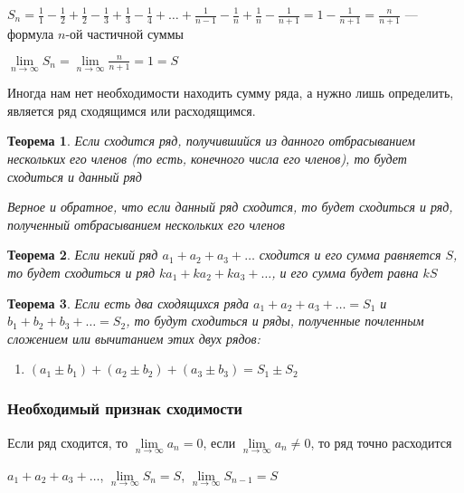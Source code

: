 \documentclass{article}
\newtheorem{theorem}{Теорема}
\begin{document}
$S_n = \frac{1}{1} - \frac{1}{2} + \frac{1}{2} - \frac{1}{3} + \frac{1}{3} - \frac{1}{4} + \dots + \frac{1}{n - 1} - \frac{1}{n} + \frac{1}{n} - \frac{1}{n + 1} = 1 - \frac{1}{n + 1} = \frac{n}{n + 1}$ — формула $n$-ой частичной суммы

$\lim\limits_{n \to \infty} S_{n} = \lim\limits_{n \to \infty} \frac{n}{n + 1} = 1 = S$


\hfill


Иногда нам нет необходимости находить сумму ряда, а нужно лишь определить, является ряд сходящимся или расходящимся.

\begin{theorem}
    Если сходится ряд, получившийся из данного отбрасыванием нескольких его членов (то есть, конечного числа его членов), то будет сходиться и данный ряд
    
    Верное и обратное, что если данный ряд сходится, то будет сходиться и ряд, полученный отбрасыванием нескольких его членов
\end{theorem}

\begin{theorem}
    Если некий ряд $a_1 + a_2 + a_3 + \dots$ сходится и его сумма равняется $S$, то будет сходиться и ряд $ka_1 + ka_2 + ka_3 + \dots$, и его сумма будет равна $k S$
\end{theorem}

\begin{theorem}
    Если есть два сходящихся ряда $a_1 + a_2 + a_3 + \dots = S_1$ и $b_1 + b_2 + b_3 + \dots = S_2$, то будут сходиться и ряды, полученные почленным сложением или вычитанием этих двух рядов:
    \begin{enumerate}
        \item $(a_1 \pm b_1) + (a_2 \pm b_2) + (a_3 \pm b_3) = S_1 \pm S_2$
    \end{enumerate}
\end{theorem}

\subsubsection{Необходимый признак сходимости}

Если ряд сходится, то $\lim\limits_{n \to \infty} a_{n} = 0$, если $\lim\limits_{n \to \infty} a_n \ne 0$, то ряд точно расходится

\hfill

$a_1 + a_2 + a_3 + \dots$, $\lim\limits_{n \to \infty} S_n = S$, $\lim\limits_{n \to \infty} S_{n - 1} = S$
\end{document}
